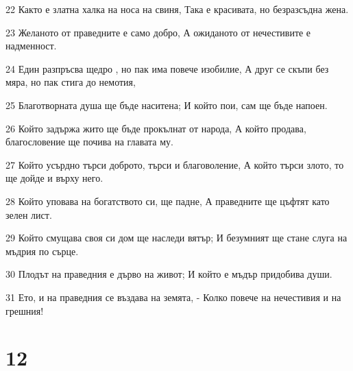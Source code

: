 \par 22 Както е златна халка на носа на свиня, Така е красивата, но безразсъдна жена.
\par 23 Желаното от праведните е само добро, А ожиданото от нечестивите е надменност.
\par 24 Един разпръсва щедро , но пак има повече изобилие, А друг се скъпи без мяра, но пак стига до немотия,
\par 25 Благотворната душа ще бъде наситена; И който пои, сам ще бъде напоен.
\par 26 Който задържа жито ще бъде прокълнат от народа, А който продава, благословение ще почива на главата му.
\par 27 Който усърдно търси доброто, търси и благоволение, А който търси злото, то ще дойде и върху него.
\par 28 Който уповава на богатството си, ще падне, А праведните ще цъфтят като зелен лист.
\par 29 Който смущава своя си дом ще наследи вятър; И безумният ще стане слуга на мъдрия по сърце.
\par 30 Плодът на праведния е дърво на живот; И който е мъдър придобива души.
\par 31 Ето, и на праведния се въздава на земята, - Колко повече на нечестивия и на грешния!

\chapter{12}


